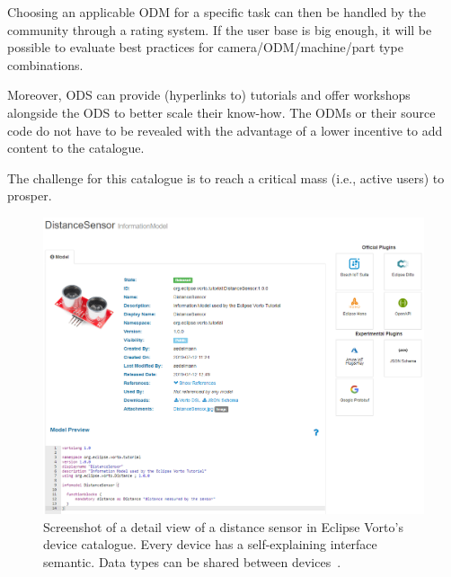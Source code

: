 Choosing an applicable ODM for a specific task can then be handled by the community through a rating system. If the user base is big enough, it will be possible to evaluate best practices for camera/ODM/machine/part type combinations.

Moreover, ODS can provide (hyperlinks to) tutorials and offer workshops alongside the ODS to better scale their know-how. The ODMs or their source code do not have to be revealed with the advantage of a lower incentive to add content to the catalogue.

The challenge for this catalogue is to reach a critical mass (i.e., active users) to prosper.

\begin{figure}[ht]
    \centering
    \includegraphics[width=\textwidth]{img/ScreenshotVortoDistanceSensor.png}
    \caption[Distance sensor in Eclipse Vorto's device catalogue]{Screenshot of a detail view of a distance sensor in Eclipse Vorto's device catalogue. Every device has a self-explaining interface semantic. Data types can be shared between devices~\cite{Eclipse2019Vorto2019}.}
    \label{fig:vorto2}
\end{figure}

